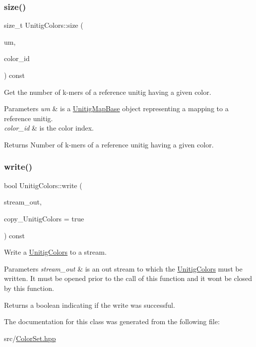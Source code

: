 \subsubsection{\texorpdfstring{size()}{size()}\hspace{0.1cm}{\footnotesize\ttfamily [2/2]}}
{\footnotesize\ttfamily size\+\_\+t Unitig\+Colors\+::size (\begin{DoxyParamCaption}\item[{const \hyperlink{structUnitigMapBase}{Unitig\+Map\+Base} \&}]{um,  }\item[{const size\+\_\+t}]{color\+\_\+id }\end{DoxyParamCaption}) const}



Get the number of k-\/mers of a reference unitig having a given color. 


\begin{DoxyParams}{Parameters}
{\em um} & is a \hyperlink{structUnitigMapBase}{Unitig\+Map\+Base} object representing a mapping to a reference unitig. \\
\hline
{\em color\+\_\+id} & is the color index. \\
\hline
\end{DoxyParams}
\begin{DoxyReturn}{Returns}
Number of k-\/mers of a reference unitig having a given color. 
\end{DoxyReturn}
\mbox{\label{classUnitigColors_adbd2e7d19983b0fc1d4b7a7a65f74689}} 
\subsubsection{\texorpdfstring{write()}{write()}}
{\footnotesize\ttfamily bool Unitig\+Colors\+::write (\begin{DoxyParamCaption}\item[{ostream \&}]{stream\+\_\+out,  }\item[{const bool}]{copy\+\_\+\+Unitig\+Colors = {\ttfamily true} }\end{DoxyParamCaption}) const}



Write a \hyperlink{classUnitigColors}{Unitig\+Colors} to a stream. 


\begin{DoxyParams}{Parameters}
{\em stream\+\_\+out} & is an out stream to which the \hyperlink{classUnitigColors}{Unitig\+Colors} must be written. It must be opened prior to the call of this function and it won\textquotesingle{}t be closed by this function. \\
\hline
\end{DoxyParams}
\begin{DoxyReturn}{Returns}
a boolean indicating if the write was successful. 
\end{DoxyReturn}


The documentation for this class was generated from the following file\+:\begin{DoxyCompactItemize}
\item 
src/\hyperlink{ColorSet_8hpp}{Color\+Set.\+hpp}\end{DoxyCompactItemize}
